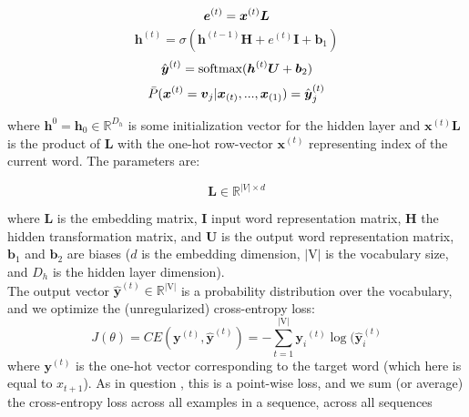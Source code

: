 \begin{equation}
{\boldsymbol e}^{(t)}  = {\boldsymbol x}^{(t)}{\boldsymbol L} \\
\end{equation}
\begin{equation}
{\boldsymbol h}^{(t)}  = \sigma({\boldsymbol h}^{(t-1)}{\boldsymbol H} + {e}^{(t)}{\boldsymbol I} + {\boldsymbol b}_{1})
\end{equation}
\begin{equation}
{\hat{\boldsymbol y}}^{(t)} = \textrm{softmax}({\boldsymbol h}^{(t)}{\boldsymbol U} + {\boldsymbol b}_{2}) \\
\end{equation}
\begin{equation}
\bar{P}({\boldsymbol x}^{(t)} = {\boldsymbol v}_{j} | {\boldsymbol x}_{(t)}, ..., {\boldsymbol x}_{(1)}) = {\hat{\boldsymbol y}}^{(t)}_{j} \\
\end{equation}

\noindent where ${\boldsymbol h}^{0} = {\boldsymbol h}_{0}\in\mathbb{R}^{D_{h}}$ is some initialization vector for the hidden layer and ${\boldsymbol x}^{(t)}{\boldsymbol L}$ is the product of ${\boldsymbol L}$ with the one-hot row-vector ${\boldsymbol x}^{(t)}$ representing index of the current word. The parameters are:

\begin{equation}
\boldsymbol L\in\mathbb{R}^{|V|\times{d}}\label{eq:dimensions questions 3a}
\end{equation}

\noindent where ${\boldsymbol L}$ is the embedding matrix, ${\boldsymbol I}$ input word representation matrix, ${\boldsymbol H}$ the hidden transformation matrix, and ${\boldsymbol U}$ is the output word representation matrix, ${\boldsymbol b}_{1}$ and ${\boldsymbol b}_{2}$ are biases ($d$ is the embedding dimension, $|\textrm{V}|$ is the vocabulary size, and $D_{h}$ is the hidden layer dimension). \\

\noindent The output vector ${\hat{\boldsymbol y}}^{(t)}\in\mathbb{R}^{|\textrm{V}|}$ is a probability distribution over the vocabulary, and we optimize the (unregularized) cross-entropy loss:
\begin{equation}
J(\theta) = CE({{\boldsymbol y}}^{(t)},{\hat{\boldsymbol y}}^{(t)}) = -\sum^{|\textrm{V}|}_{t=1} {{\boldsymbol y_{i}}}^{(t)}\log({\hat{\boldsymbol y}}^{(t)}_{i}
\end{equation}
\noindent where ${{\boldsymbol y}}^{(t)}$ is the one-hot vector corresponding to the target word (which here is equal to $x_{t+1}$). As in question , this is a point-wise loss, and we sum (or average) the cross-entropy loss across all examples in a sequence, across all sequences




